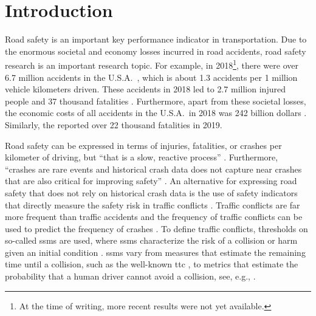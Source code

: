 \section{Introduction}
\label{sec:introduction}

Road safety is an important key performance indicator in transportation. 
Due to the enormous societal and economy losses incurred in road accidents, road safety research is an important research topic.
For example, in 2018\cstarta\footnote{\cstarta At the time of writing, more recent results were not yet available.\cenda}\cenda, there were over 6.7 million accidents in the U.S.A.\ \autocite{nhtsa2020summary}, which is about 1.3 accidents per 1 million vehicle kilometers driven.
These accidents in 2018 led to 2.7 million injured people and 37 thousand fatalities \autocite{nhtsa2020summary}.
Furthermore, apart from these societal losses, the economic costs of all accidents in the U.S.A.\ in 2018 was 242 billion dollars \autocite{nhtsa2020summary}.
Similarly, the \textcite{eu2020roadsafety} reported over 22 thousand fatalities in 2019.

Road safety can be expressed in terms of injuries, fatalities, or crashes per kilometer of driving, but \cstartb ``that is a slow, reactive process'' \autocite{arun2021systematic}.
Furthermore, ``crashes are rare events and historical crash data does not capture near crashes that are also critical for improving safety'' \autocite{wang2021review}.
An alternative for expressing road safety \cendb that does not rely on historical crash data is the use of safety indicators that directly measure the safety risk in traffic conflicts \cstartb \autocite{arun2021systematic, wang2021review, tarko2018surrogate}\cendb.
Traffic conflicts are far more frequent than traffic accidents and the frequency of traffic conflicts can be used to predict the frequency of crashes \cstartb \autocite{tarko2018estimating, davis2011outline}\cendb.
\cstartb To define traffic conflicts, thresholds on so-called \acp{ssm} are used, where \acp{ssm} characterize the risk of a collision or harm given an initial condition \autocite{arun2021systematic}. \cendb
\acp{ssm} vary from measures that estimate the remaining time until a collision, such as the well-known \ac{ttc} \autocite{hayward1972near}, to metrics that estimate the probability that a human driver cannot avoid a collision, see, e.g., \autocite{wang2014evaluation}.

